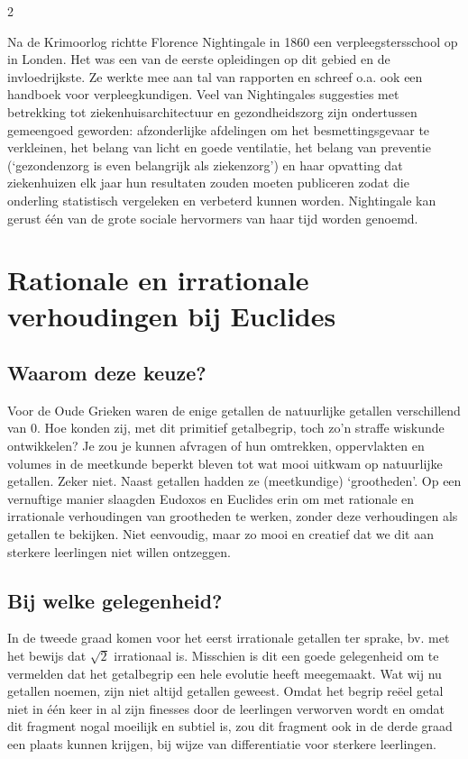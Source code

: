 \begin{multicols}{2}

Na de Krimoorlog richtte Florence Nightingale in 1860 een verpleegstersschool op in Londen. Het was een van de eerste opleidingen op dit gebied en de invloedrijkste. Ze werkte mee aan tal van rapporten en schreef o.a. ook een handboek voor verpleegkundigen. Veel van Nightingales suggesties met betrekking tot ziekenhuisarchitectuur en gezondheidszorg zijn ondertussen gemeengoed geworden: afzonderlijke afdelingen om het besmettingsgevaar te verkleinen, het belang van licht en goede ventilatie, het belang van preventie (‘gezondenzorg is even belangrijk als ziekenzorg’) en haar opvatting dat ziekenhuizen elk jaar hun resultaten zouden moeten publiceren zodat die onderling statistisch vergeleken	en	verbeterd	kunnen	worden. Nightingale kan gerust één van de grote sociale hervormers van haar tijd worden genoemd.
	
	\section{Rationale en irrationale verhoudingen bij Euclides}
	
	\subsection*{Waarom deze keuze?}
	
	Voor de Oude Grieken waren de enige getallen de natuurlijke getallen verschillend van 0. Hoe konden zij, met dit primitief getalbegrip, toch zo'n straffe wiskunde ontwikkelen? Je zou je kunnen afvragen of hun omtrekken, oppervlakten en volumes in de meetkunde beperkt bleven tot wat mooi uitkwam op natuurlijke getallen. Zeker niet. Naast getallen hadden ze (meetkundige) `grootheden'. Op een vernuftige manier slaagden Eudoxos en Euclides erin om met rationale en irrationale verhoudingen van grootheden te werken, zonder deze verhoudingen als getallen te bekijken. Niet eenvoudig, maar zo mooi en creatief dat we dit aan sterkere leerlingen niet willen ontzeggen.
	
	\subsection*{Bij welke gelegenheid?}
	
	In de tweede graad komen voor het eerst irrationale getallen ter sprake, bv. met het bewijs dat $\sqrt{2}$ irrationaal is. Misschien is dit een goede gelegenheid om te vermelden dat het getalbegrip een hele evolutie heeft meegemaakt. Wat wij nu getallen noemen, zijn niet altijd getallen geweest. Omdat het begrip reëel getal niet in één keer in al zijn finesses door de leerlingen verworven wordt en omdat dit fragment nogal moeilijk en subtiel is, zou dit fragment ook in de derde graad een plaats kunnen krijgen, bij wijze van differentiatie voor sterkere leerlingen.
	

\end{multicols}
